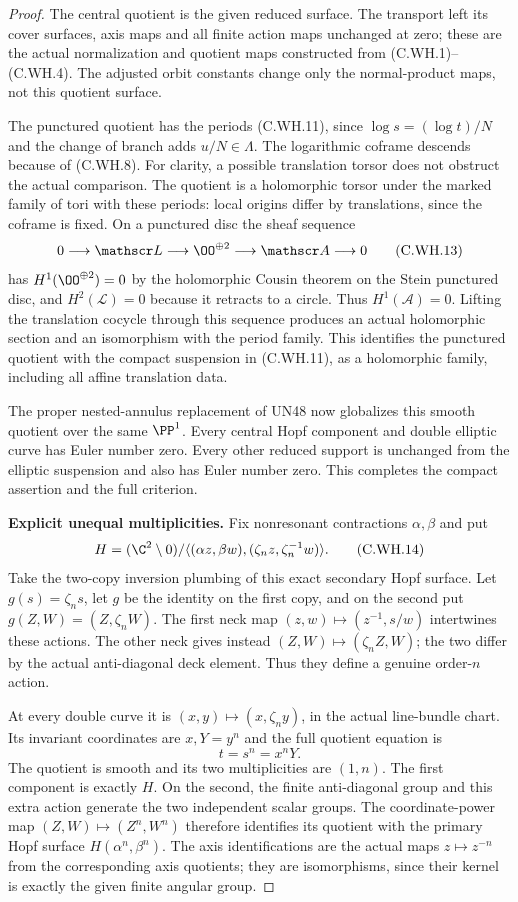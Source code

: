 \begin{proof}
The central quotient is the
given reduced surface. The
transport left its cover surfaces,
axis maps and all finite action
maps unchanged at zero; these
are the actual normalization
and quotient maps constructed
from (C.WH.1)--(C.WH.4).
The adjusted orbit constants
change only the normal-product
maps, not this quotient surface.

The punctured quotient has the
periods (C.WH.11), since
$\log s=(\log t)/N$ and the
change of branch adds $u/N\in\Lambda$.
The logarithmic coframe descends
because of (C.WH.8).
For clarity, a possible translation
torsor does not obstruct the
actual comparison. The quotient
is a holomorphic torsor under
the marked family of tori with
these periods: local origins
differ by translations, since
the coframe is fixed. On a
punctured disc the sheaf sequence
\[
 0\longrightarrow\mathscr L
   \longrightarrow\OO^{\oplus2}
   \longrightarrow\mathscr A
   \longrightarrow0
\tag{C.WH.13}
\]
has $H^1(\OO^{\oplus2})=0$ by
the holomorphic Cousin theorem
on the Stein punctured disc,
and $H^2(\mathscr L)=0$ because
it retracts to a circle.
Thus $H^1(\mathscr A)=0$.
Lifting the translation cocycle
through this sequence produces
an actual holomorphic section
and an isomorphism with the
period family. This identifies
the punctured quotient with
the compact suspension in
(C.WH.11), as a holomorphic
family, including all affine
translation data.

The proper nested-annulus
replacement of UN48 now
globalizes this smooth quotient
over the same $\PP^1$.
Every central Hopf component
and double elliptic curve
has Euler number zero.
Every other reduced support
is unchanged from the elliptic
suspension and also has Euler
number zero. This completes
the compact assertion and
the full criterion.

\par\medskip\noindent\textbf{Explicit unequal multiplicities.}
Fix nonresonant contractions
$\alpha,\beta$ and put
\[
 H=(\C^2\setminus0)/
  \langle(\alpha z,\beta w),
              (\zeta_n z,\zeta_n^{-1}w)\rangle .
\tag{C.WH.14}
\]
Take the two-copy inversion
plumbing of this exact secondary
Hopf surface. Let $g(s)=\zeta_n s$,
let $g$ be the identity on the
first copy, and on the second
put $g(Z,W)=(Z,\zeta_n W)$.
The first neck map
$(z,w)\mapsto(z^{-1},s/w)$
intertwines these actions.
The other neck gives instead
$(Z,W)\mapsto(\zeta_n Z,W)$;
the two differ by the actual
anti-diagonal deck element.
Thus they define a genuine
order-$n$ action.

At every double curve it is
$(x,y)\mapsto(x,\zeta_n y)$,
in the actual line-bundle chart.
Its invariant coordinates are
$x,Y=y^n$ and the full quotient
equation is
\[
                              t=s^n=x^nY .
\tag{C.WH.15}
\]
The quotient is smooth and its
two multiplicities are $(1,n)$.
The first component is exactly
$H$. On the second, the finite
anti-diagonal group and this
extra action generate the two
independent scalar groups.
The coordinate-power map
$(Z,W)\mapsto(Z^n,W^n)$
therefore identifies its
quotient with the primary
Hopf surface
$H(\alpha^n,\beta^n)$.
The axis identifications are
the actual maps $z\mapsto z^{-n}$
from the corresponding axis
quotients; they are isomorphisms,
since their kernel is exactly
the given finite angular group.


\end{proof}
